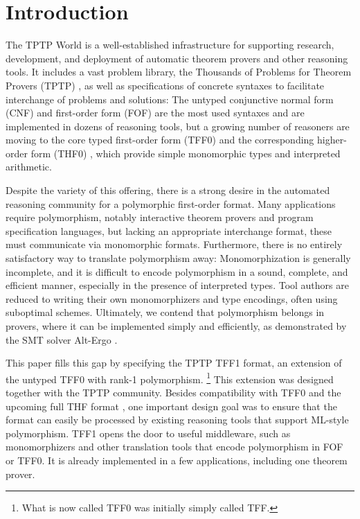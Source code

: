 \section{Introduction}
\label{sec_intro}

The TPTP World \cite{sutcliffe-2010-world} is a well-established infrastructure
for supporting research, development, and deployment of automatic theorem
provers and other reasoning tools. It includes a vast problem library, the
Thousands of Problems for Theorem Provers (TPTP) \cite{sutcliffe-2009-lib}, as
well as specifications of concrete syntaxes to facilitate interchange of
problems and solutions: The untyped conjunctive normal form (CNF) and
first-order form (FOF) are the most used syntaxes and are implemented in dozens
of reasoning tools, but a growing number of reasoners are moving to the core
typed first-order form (TFF0) \cite{TFF0} and the corresponding higher-order
form (THF0) \cite{benzmueller-et-al-2008-thf0}, which provide simple monomorphic
types and interpreted arithmetic.

Despite the variety of this offering, there is a strong desire in the automated
reasoning community for a polymorphic first-order format. Many applications
require polymorphism, notably interactive theorem provers and program
specification languages, but lacking an appropriate interchange format, these
must communicate via monomorphic formats. Furthermore, there is no entirely
satisfactory way to translate polymorphism away: Monomorphization is generally
incomplete, and it is difficult to encode polymorphism in a sound, complete, and
efficient manner, especially in the presence of interpreted types. Tool authors
are reduced to writing their own monomorphizers and type encodings, often using
suboptimal schemes. Ultimately, we contend that polymorphism belongs in provers,
where it can be implemented simply and efficiently, as demonstrated by the SMT
solver Alt-Ergo \cite{bobot-et-al-2008}.

This paper fills this gap by specifying the TPTP TFF1 format, an extension of the
untyped TFF0 with rank-1 polymorphism.%
\footnote{What is now called TFF0 was initially simply called TFF.}
This extension was designed together with the TPTP community. Besides compatibility
with TFF0 and the upcoming full THF format \cite{xxx}, one important design goal
was to ensure that the format can easily be processed by existing reasoning
tools that support ML-style polymorphism. TFF1 opens the door to useful
middleware, such as monomorphizers and other translation tools that encode
polymorphism in FOF or TFF0. It is already implemented in a few applications,
including one theorem prover.

